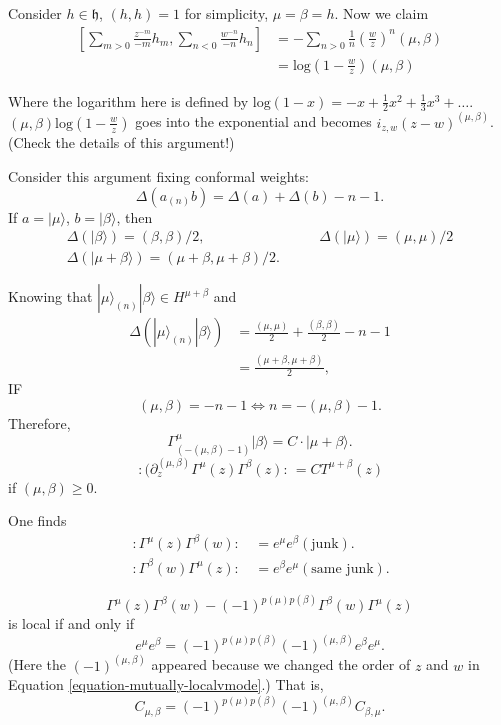 \noindent
Consider $h \in \mathfrak{h}$, $(h,h)=1$ for simplicity,
$\mu=\beta=h$. Now we claim
\begin{align*}
\left[ \sum_{m>0}\frac{z^{-m}}{-m}h_m,
\sum_{n<0}\frac{w^{-n}}{-n}h_n \right] &=
-\sum_{n>0}\frac{1}{n}\left(\frac{w}{z}\right)^n(\mu,\beta)\\
&=\text{log}(1-\frac{w}{z})(\mu,\beta)
\end{align*}

\noindent
Where the logarithm here is defined by
$\text{log}(1-x)=-x+\frac{1}{2}x^2+\frac{1}{3}x^3+\ldots$.
$(\mu,\beta)\text{log}(1-\frac{w}{z})$ goes into the exponential
and becomes $i_{z,w}(z-w)^{(\mu,\beta)}$.
(Check the details of this argument!)

\medskip\noindent
Consider this argument fixing conformal weights:
$$
\Delta(a_{(n)}b)=\Delta(a)+\Delta(b)-n-1.
$$
If $a=|\mu\rangle$, $b=|\beta\rangle$, then
\begin{align*}
\Delta(|\beta\rangle)=(\beta,\beta)/2,&\qquad 
\Delta(|\mu\rangle)=(\mu,\mu)/2\\
\Delta(|\mu+\beta\rangle)=(\mu+\beta,\mu+\beta)/2.
\end{align*}

\noindent
Knowing that $|\mu\rangle_{(n)}|\beta\rangle\in H^{\mu+\beta}$
and
\begin{align*}
\Delta(|\mu\rangle_{(n)}|\beta\rangle)&=
\frac{(\mu,\mu)}{2}+\frac{(\beta,\beta)}{2}-n-1\\
&=\frac{(\mu+\beta,\mu+\beta)}{2},
\end{align*}
IF
$$
(\mu,\beta)=-n-1 \iff n=-(\mu,\beta)-1.
$$
Therefore,
$$
\Gamma^\mu_{(-(\mu,\beta)-1)}|\beta\rangle=C\cdot|\mu+\beta\rangle.
$$
$$
\,:\!(\partial_z^{(\mu,\beta)}\Gamma^\mu(z)\Gamma^\beta(z)\!:\,
=CT^{\mu+\beta}(z)
$$
if $(\mu,\beta)\geq 0$.

One finds
\begin{align*}
\,:\!\Gamma^\mu(z)\Gamma^\beta(w)\!:\,&=e^\mu e^\beta(\text{junk}).\\
\,:\!\Gamma^\beta(w)\Gamma^\mu(z)\!:\,&=e^\beta e^\mu(\text{same junk}).
\end{align*}

\noindent
$$
\Gamma^\mu(z)\Gamma^\beta(w)-(-1)^{p(\mu)p(\beta)}\Gamma^\beta(w)\Gamma^\mu(z)
$$
is local if and only if
$$
e^\mu e^\beta=(-1)^{p(\mu)p(\beta)}(-1)^{(\mu,\beta)}e^\beta e^\mu.
$$
(Here the $(-1)^{(\mu,\beta)}$ appeared because we changed the 
order of $z$ and $w$ in Equation \ref{equation-mutually-localvmode}.)
That is,
\begin{equation}
\label{equation-quantum-relation}
C_{\mu,\beta}=(-1)^{p(\mu)p(\beta)}(-1)^{(\mu,\beta)}C_{\beta,\mu}.
\end{equation}

